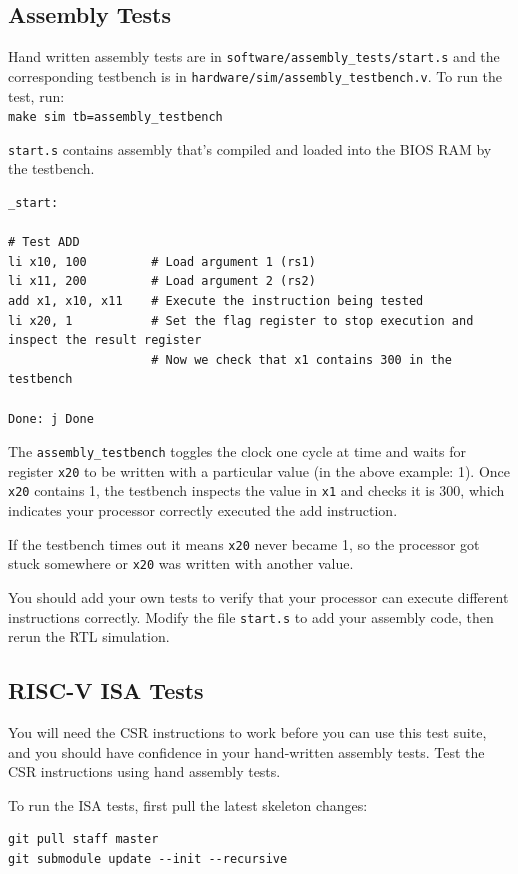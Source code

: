 \documentclass[11pt]{article}
\begin{document}
\subsection{Assembly Tests}
\label{assembly_tests}
Hand written assembly tests are in \verb|software/assembly_tests/start.s| and the corresponding testbench is in \verb|hardware/sim/assembly_testbench.v|.
To run the test, run:\\
\verb|make sim tb=assembly_testbench|

\verb|start.s| contains assembly that's compiled and loaded into the BIOS RAM by the testbench.
\begin{verbatim}
_start:

# Test ADD
li x10, 100         # Load argument 1 (rs1)
li x11, 200         # Load argument 2 (rs2)
add x1, x10, x11    # Execute the instruction being tested
li x20, 1           # Set the flag register to stop execution and inspect the result register
                    # Now we check that x1 contains 300 in the testbench

Done: j Done
\end{verbatim}

The \verb|assembly_testbench| toggles the clock one cycle at time and waits for register \verb|x20| to be written with a particular value (in the above example: 1).
Once \verb|x20| contains 1, the testbench inspects the value in \verb|x1| and checks it is 300, which indicates your processor correctly executed the add instruction.

If the testbench times out it means \verb|x20| never became 1, so the processor got stuck somewhere or \verb|x20| was written with another value.

You should add your own tests to verify that your processor can execute different instructions correctly. Modify the file \verb|start.s| to add your assembly code, then rerun the RTL simulation.

\subsection{RISC-V ISA Tests}
You will need the CSR instructions to work before you can use this test suite, and you should have confidence in your hand-written assembly tests.
Test the CSR instructions using hand assembly tests.

To run the ISA tests, first pull the latest skeleton changes:
\begin{verbatim}
git pull staff master
git submodule update --init --recursive
\end{verbatim}
\end{document}
